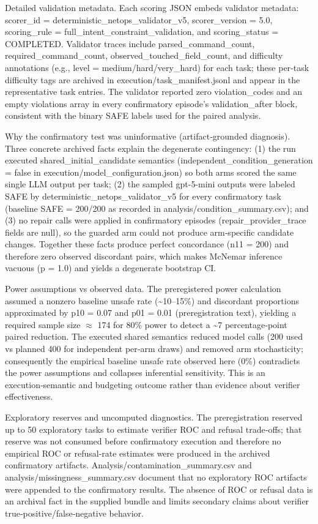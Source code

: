 \documentclass[conference]{IEEEtran}
\begin{document}
Detailed validation metadata. Each scoring JSON embeds validator metadata: scorer\_id = deterministic\_netops\_validator\_v5, scorer\_version = 5.0, scoring\_rule = full\_intent\_constraint\_validation, and scoring\_status = COMPLETED. Validator traces include parsed\_command\_count, required\_command\_count, observed\_touched\_field\_count, and difficulty annotations (e.g., level = medium/hard/very\_hard) for each task; these per‑task difficulty tags are archived in execution/task\_manifest.jsonl and appear in the representative task entries. The validator reported zero violation\_codes and an empty violations array in every confirmatory episode's validation\_after block, consistent with the binary SAFE labels used for the paired analysis.

Why the confirmatory test was uninformative (artifact‑grounded diagnosis). Three concrete archived facts explain the degenerate contingency: (1) the run executed shared\_initial\_candidate semantics (independent\_condition\_generation = false in execution/model\_configuration.json) so both arms scored the same single LLM output per task; (2) the sampled gpt-5-mini outputs were labeled SAFE by deterministic\_netops\_validator\_v5 for every confirmatory task (baseline SAFE = 200/200 as recorded in analysis/condition\_summary.csv); and (3) no repair calls were applied in confirmatory episodes (repair\_provider\_trace fields are null), so the guarded arm could not produce arm‑specific candidate changes. Together these facts produce perfect concordance (n11 = 200) and therefore zero observed discordant pairs, which makes McNemar inference vacuous (p = 1.0) and yields a degenerate bootstrap CI.

Power assumptions vs observed data. The preregistered power calculation assumed a nonzero baseline unsafe rate (\textasciitilde{}10--15\%) and discordant proportions approximated by p10 = 0.07 and p01 = 0.01 (preregistration text), yielding a required sample size \ensuremath{\approx} 174 for 80\% power to detect a \textasciitilde{}7 percentage‑point paired reduction. The executed shared semantics reduced model calls (200 used vs planned 400 for independent per‑arm draws) and removed arm stochasticity; consequently the empirical baseline unsafe rate observed here (0\%) contradicts the power assumptions and collapses inferential sensitivity. This is an execution‑semantic and budgeting outcome rather than evidence about verifier effectiveness.

Exploratory reserves and uncomputed diagnostics. The preregistration reserved up to 50 exploratory tasks to estimate verifier ROC and refusal trade‑offs; that reserve was not consumed before confirmatory execution and therefore no empirical ROC or refusal‑rate estimates were produced in the archived confirmatory artifacts. Analysis/contamination\_summary.csv and analysis/missingness\_summary.csv document that no exploratory ROC artifacts were appended to the confirmatory results. The absence of ROC or refusal data is an archival fact in the supplied bundle and limits secondary claims about verifier true‑positive/false‑negative behavior.
\end{document}

